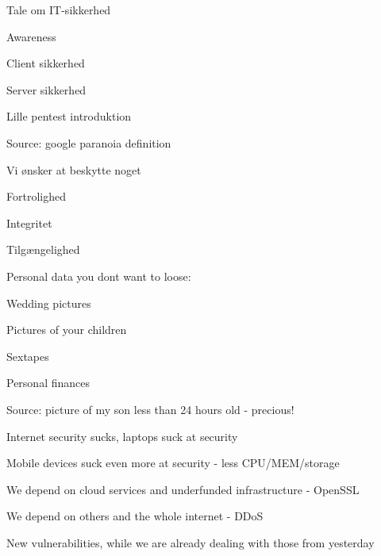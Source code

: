 \documentclass[20pt,landscape,a4paper,footrule]{foils}
\begin{document}




\begin{list1}
\item Tale om IT-sikkerhed
\item Awareness
\item Client sikkerhed
\item Server sikkerhed
\item Lille pentest introduktion
\end{list1}




Source: google paranoia definition



\begin{list1}
\item Vi ønsker at beskytte noget
\item Fortrolighed
\item Integritet
\item Tilgængelighed
\end{list1}


\begin{list1}
\item Personal data you dont want to loose:
\begin{list2}
\item Wedding pictures
\item Pictures of your children
\item Sextapes
\item Personal finances
\end{list2}
\end{list1}

Source: picture of my son less than 24 hours old - precious!



\begin{list1}
\item Internet security sucks, laptops suck at security
\item Mobile devices suck even more at security - less CPU/MEM/storage
\item We depend on cloud services and underfunded infrastructure - OpenSSL
\item We depend on others and the whole internet - DDoS
\item New vulnerabilities, while we are already dealing with those from yesterday
\end{list1}
\end{document}
